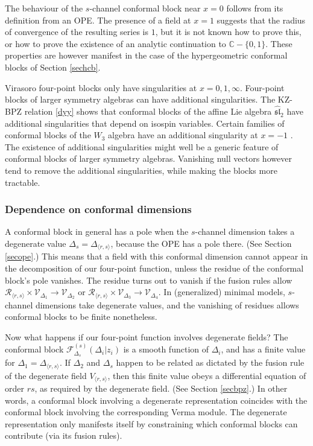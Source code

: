 \documentclass[12pt, a4paper, notitlepage, twoside]{report}
\numberwithin{equation}{section}
\theoremstyle{break}
\begin{document}
The behaviour of the $s$-channel conformal block near $x=0$ follows from its definition from an OPE. The presence of a field at $x=1$ suggests that the radius of convergence of the resulting series is $1$, but it is not known how to prove this, or how to prove the existence of an analytic continuation to $\mathbb{C}-\{0,1\}$. These properties are however manifest in the case of the hypergeometric conformal blocks of Section \ref{sechcb}. 

Virasoro four-point blocks only have singularities at $x=0,1,\infty$. Four-point blocks of larger symmetry algebras can have additional singularities. The KZ-BPZ relation \eqref{dyy} shows that conformal blocks of the affine Lie algebra $\hat{\mathfrak{sl}}_2$ have additional singularities that depend on isospin variables. Certain families of conformal blocks of the $W_3$ algebra have an additional singularity at $x=-1$ \cite{fr11}. The existence of additional singularities might well be a generic feature of conformal blocks of larger symmetry algebras. Vanishing null vectors however tend to remove the additional singularities, while making the blocks more tractable.

\subsubsection{Dependence on conformal dimensions}

A conformal block in general has a pole when the $s$-channel dimension takes a degenerate value $\Delta_s=\Delta_{\langle r,s\rangle}$, because the OPE has a pole there. (See Section \ref{secope}.) 
This means that a field with this conformal dimension cannot appear in the decomposition of our four-point function, unless the residue of the conformal block's pole vanishes. The residue turns out to vanish if the fusion rules allow $\mathcal{R}_{\langle r,s \rangle}\times \mathcal{V}_{\Delta_1}\to \mathcal{V}_{\Delta_2}$ or $\mathcal{R}_{\langle r,s \rangle}\times \mathcal{V}_{\Delta_3}\to \mathcal{V}_{\Delta_4}$. 
In (generalized) minimal models, $s$-channel dimensions take degenerate values, and the vanishing of residues allows conformal blocks to be finite nonetheless.

Now what happens if our four-point function involves degenerate fields? 
The conformal block $\mathcal{F}^{(s)}_{\Delta_s}(\Delta_i|z_i)$ is a smooth function of $\Delta_i$, and has a finite value for $\Delta_1 = \Delta_{\langle r,s\rangle}$. 
If $\Delta_2$ and $\Delta_s$ happen to be related as dictated by the fusion rule of the degenerate field $V_{\langle r,s\rangle}$, then this finite value obeys a differential equation of order $rs$, as required by the degenerate field. (See Section \ref{secbpz}.) 
In other words, a conformal block involving a degenerate representation coincides with the conformal block involving the corresponding Verma module.
The degenerate representation only manifests itself by constraining which conformal blocks can contribute (via its fusion rules).
\end{document}
